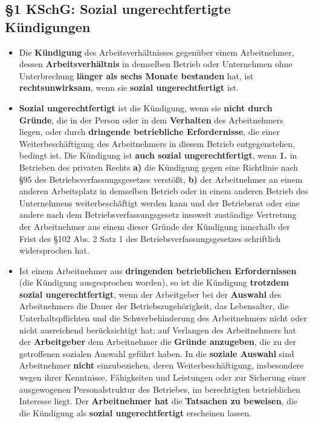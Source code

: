 \documentclass[a4paper, 12pt]{report}
\begin{document}
\begin{multicols}{2}
\subsection{\S 1 KSchG: Sozial ungerechtfertigte Kündigungen}

\begin{itemize}
    \item[(1)] Die \textbf{Kündigung} des Arbeitsverhältnisses gegenüber einem
	Arbeitnehmer, dessen \textbf{Arbeitsverhältnis} in demselben Betrieb
	oder Unternehmen ohne Unterbrechung \textbf{länger als sechs Monate
	bestanden} hat, ist \textbf{rechtsunwirksam}, wenn sie \textbf{sozial
	ungerechtfertigt} ist.
    \item[(2)] \textbf{Sozial ungerechtfertigt} ist die Kündigung, wenn sie
	\textbf{nicht durch Gründe}, die in der Person oder in dem
	\textbf{Verhalten} des Arbeitnehmers liegen, oder durch
	\textbf{dringende betriebliche Erfordernisse}, die einer
	Weiterbeschäftigung des Arbeitnehmers in diesem Betrieb entgegenstehen,
	bedingt ist. Die Kündigung ist \textbf{auch sozial ungerechtfertigt},
	wenn \textbf{1.} in Betrieben des privaten Rechts \textbf{a)} die
	Kündigung gegen eine Richtlinie nach \S 95 des
	Betriebsverfassungsgesetzes verstößt, \textbf{b)} der Arbeitnehmer an
	einem anderen Arbeitsplatz in demselben Betrieb oder in einem anderen
	Betrieb des Unternehmens weiterbeschäftigt werden kann und der
	Betriebsrat oder eine andere nach dem Betriebsverfassungsgesetz insoweit
	zuständige Vertretung der Arbeitnehmer aus einem dieser Gründe der
	Kündigung innerhalb der Frist des \S 102 Abs. 2 Satz 1 des
	Betriebsverfassungsgesetzes schriftlich widersprochen hat.
    \item[(3)] Ist einem Arbeitnehmer aus \textbf{dringenden betrieblichen
	Erfordernissen} (die Kündigung ausgesprochen worden), so ist die
	Kündigung \textbf{trotzdem sozial ungerechtfertigt}, wenn der
	Arbeitgeber bei der \textbf{Auswahl} des Arbeitnehmers die Dauer der
	Betriebszugehörigkeit, das Lebensalter, die Unterhaltspflichten und
	die Schwerbehinderung des Arbeitnehmers nicht oder nicht ausreichend
	berücksichtigt hat; auf Verlangen des Arbeitnehmers hat der
	\textbf{Arbeitgeber} dem Arbeitnehmer die \textbf{Gründe anzugeben},
	die zu der getroffenen sozialen Auswahl geführt haben. In die
	\textbf{soziale Auswahl} sind Arbeitnehmer \textbf{nicht} einzubeziehen,
	deren Weiterbeschäftigung, insbesondere wegen ihrer Kenntnisse,
	Fähigkeiten und Leistungen oder zur Sicherung einer ausgewogenen
	Personalstruktur des Betriebes, im berechtigten betrieblichen Interesse
	liegt.  Der \textbf{Arbeitnehmer hat} die \textbf{Tatsachen zu
	beweisen}, die die Kündigung als \textbf{sozial ungerechtfertigt}
	erscheinen lassen.
\end{itemize}


\end{multicols}
\end{document}
